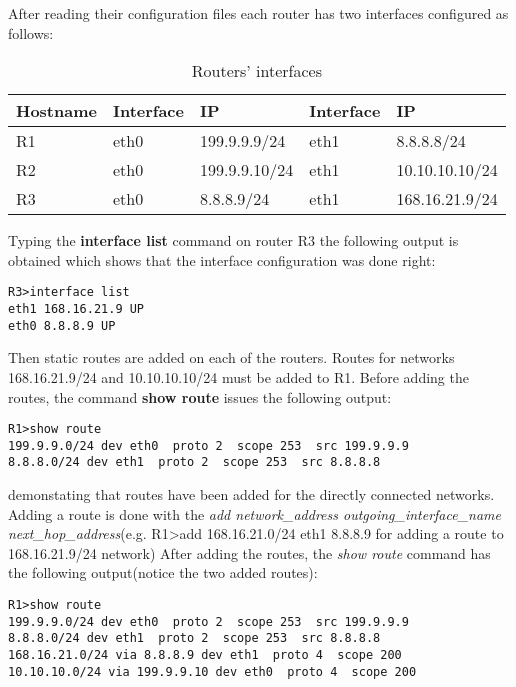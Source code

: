 {{After reading their configuration files each router has two interfaces configured as follows:
\begin{center}
  \begin{table}[htb]
  \begin{center}
  \begin{tabular}{| l | l | l | l | l |}
    \hline
      Hostname & Interface & IP & Interface & IP \\ \hline
      R1 & eth0 & 199.9.9.9/24 & eth1 & 8.8.8.8/24 \\ \hline
      R2 & eth0 & 199.9.9.10/24 & eth1 & 10.10.10.10/24\\ \hline
      R3 & eth0 & 8.8.8.9/24 & eth1 & 168.16.21.9/24 \\
    \hline
  \end{tabular}
  \end{center}
  \caption{Routers' interfaces}
  \label{table:tdevices}
  \end{table}
\end{center}
Typing the \textbf{interface list} command on router R3 the following output is obtained which shows that the interface configuration was done right:
\lstset{language=TeX, caption=Router R3 interfaces}
\begin{lstlisting}
R3>interface list  
eth1 168.16.21.9 UP
eth0 8.8.8.9 UP
\end{lstlisting}

Then static routes are added on each of the routers.
Routes for networks 168.16.21.9/24 and 10.10.10.10/24 must be added to R1.
Before adding the routes, the command \textbf{show route} issues the following output:
\lstset{language=TeX, caption=Directly connected routes}
\begin{lstlisting}
R1>show route  
199.9.9.0/24 dev eth0  proto 2  scope 253  src 199.9.9.9 
8.8.8.0/24 dev eth1  proto 2  scope 253  src 8.8.8.8 
\end{lstlisting}
demonstating that routes have been added for the directly connected networks.
Adding a route is done with the \textit{add network_address outgoing_interface_name next_hop_address}(e.g. R1>add 168.16.21.0/24 eth1 8.8.8.9 for adding a route to 168.16.21.9/24 network)
After adding the routes, the \textit{show route} command has the following output(notice the two added routes):
\lstset{language=TeX, caption=R1 routing table}
\begin{lstlisting}
R1>show route  
199.9.9.0/24 dev eth0  proto 2  scope 253  src 199.9.9.9 
8.8.8.0/24 dev eth1  proto 2  scope 253  src 8.8.8.8 
168.16.21.0/24 via 8.8.8.9 dev eth1  proto 4  scope 200
10.10.10.0/24 via 199.9.9.10 dev eth0  proto 4  scope 200
\end{lstlisting}

}}
